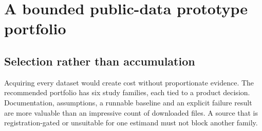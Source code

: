 \hypertarget{pd15:portfolio}{%
\chapter{A bounded public-data prototype
portfolio}\label{pd15:portfolio}}

\hypertarget{selection-rather-than-accumulation}{%
\section{Selection rather than
accumulation}\label{selection-rather-than-accumulation}}

Acquiring every dataset would create cost without proportionate
evidence. The recommended portfolio has six study families, each tied to
a product decision. Documentation, assumptions, a runnable baseline and
an explicit failure result are more valuable than an impressive count of
downloaded files. A source that is registration-gated or unsuitable for
one estimand must not block another family.

